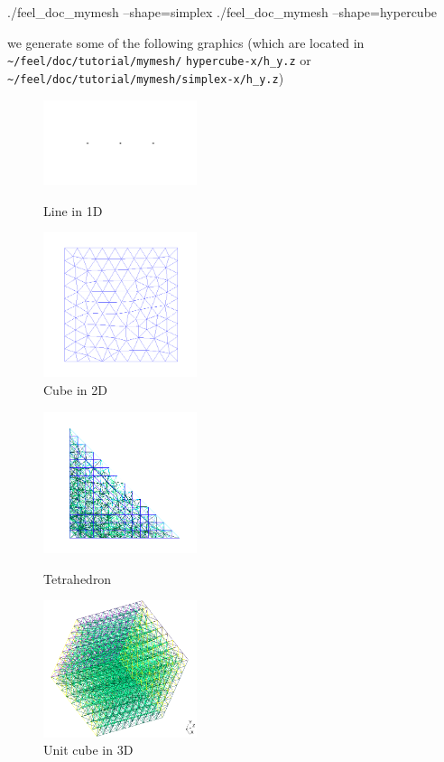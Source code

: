 \begin{unixcom}
		./feel_doc_mymesh --shape=simplex
		./feel_doc_mymesh --shape=hypercube
\end{unixcom}
we generate some of the following graphics (which are located in \verb|~/feel/doc/tutorial/mymesh/| \newline \verb|hypercube-x/h_y.z| or \verb|~/feel/doc/tutorial/mymesh/simplex-x/h_y.z|)
\begin{figure}[!h]
\begin{minipage}[b]{.50\linewidth}
\centering
\includegraphics[width=4.5cm]{pngs/mymesh/hypercube_1.png}
\caption{Line in 1D}
\end{minipage}
\begin{minipage}[b]{.50\linewidth}
\centering
\includegraphics[width=4.5cm]{pngs/mymesh/hypercube_2.png}
\caption{Cube in 2D}
\end{minipage}
\label{fig.erreur}
\end{figure}
\newline
\begin{figure}[!h]
\begin{minipage}[b]{.50\linewidth}
\centering
\includegraphics[width=4.5cm]{pngs/mymesh/simplex_3.png}
\caption{Tetrahedron}
\end{minipage}
\begin{minipage}[b]{.50\linewidth}
\centering
\includegraphics[width=4.5cm]{pngs/mymesh/hypercube_3.png}
\caption{Unit cube in 3D}
\end{minipage}
\end{figure}

